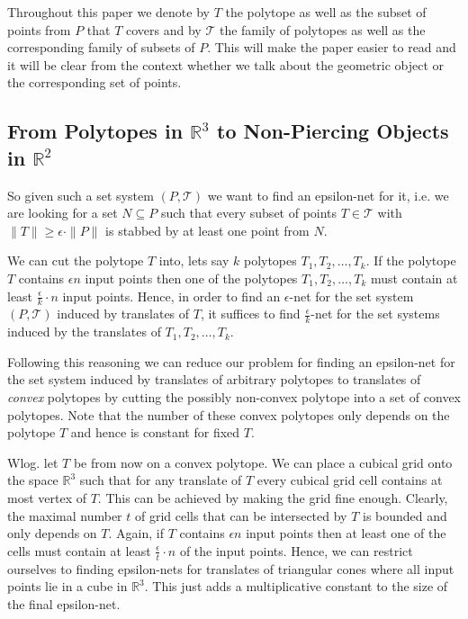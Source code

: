 \documentclass{stacs_proc}
\newcommand{\setR}{\mathbb{R}}
\newcommand{\T}{\mathcal{T}}
\begin{document}
 Throughout this paper we denote by $T$ the polytope as well as
the subset of points from $P$ that $T$ covers and by $\T$ the family
of polytopes as well as the corresponding family of subsets of
$P$. This will make the paper easier to read and it 
will be clear from the context whether we talk about the geometric
object or the corresponding set of points.


\subsection{From Polytopes in $\setR^3$ to Non-Piercing Objects in $\setR^2$}



So given such a set system $(P, \T)$ we want to find an epsilon-net
for it, i.e. we are looking for a set $N\subseteq P$ such that every subset of
points $T\in \T$ with $\|T\|\geq \epsilon \cdot \|P\|$ is stabbed by at least one point
from $N$. 

We can cut the polytope $T$ into, lets say $k$ polytopes $T_1, T_2, 
\ldots, T_k$. If the polytope $T$ contains $\epsilon n$ input points then one
of the polytopes $T_1, T_2, \ldots, T_k$ must contain at least $\frac{\epsilon}{k} \cdot n$
input points. Hence, in order to find an $\epsilon$-net for the set system
$(P, \T)$ 
induced by translates of $T$, it suffices to find $\frac{\epsilon}{k}$-net
for the set systems induced by the translates of $T_1, T_2, \ldots, T_k$.

Following this reasoning we can reduce our problem for finding an
epsilon-net for the set system induced by translates of arbitrary
polytopes to translates of \emph{convex} polytopes by cutting the
possibly non-convex polytope into a set of convex polytopes.
Note that the number of these convex polytopes only depends on the
polytope $T$ and hence is constant for fixed $T$. 


Wlog. let $T$ be from now on a convex polytope.
We can place a cubical grid onto the space $\setR^3$ such that for
any translate of $T$ every cubical grid cell contains at most
vertex of $T$. This can be achieved by making the grid fine
enough. Clearly, the maximal number $t$ of grid cells that can be
intersected by $T$ is bounded and only depends on $T$. Again, if
$T$ contains $\epsilon n$ input points then at least one of the cells
must contain at least $\frac{\epsilon}{t}\cdot n$ of the input points. Hence, we
can restrict ourselves to finding epsilon-nets for translates of 
triangular cones
where all input points lie in a cube in $\setR^3$. This just adds a
multiplicative constant to the size of the final epsilon-net.
\end{document}
